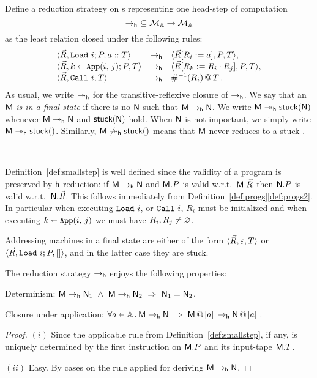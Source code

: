 \begin{defi}\label{def:smallstep}
Define a reduction strategy on \am s representing one head-step of computation
\[
	\redh\ \subseteq\cM\to\cM
\]
as the least relation closed under the following rules:
\[
	\begin{array}{lcl}
	\tuple{\vec R,\RaS i;P,\Cons a{T}} &\redh& \tuple{\vec R[R_i := a],P,T},\\
	\tuple{\vec R,\Apply i j k; P,T}&\redh&\tuple{\vec R[R_k := \App{R_i}{R_j}],P,T},\\
	\tuple{\vec R,\Call i,T}&\redh&\appT{\Lookinv {R_i}}{T}.\\
	\end{array}
\]
As usual, we write $\reddh$ for the transitive-reflexive closure of $\redh$.
We say that an \am{} $\mM$ \emph{is in a final state} if there is no $\mN$ such that $\mM\redh \mN$.
We write $\mM\reddh \stuck{\mN}$ whenever $\mM\reddh \mN$ and $\stuck{\mN}$ hold.
When $\mN$ is not important, we simply write $\mM\reddh\stuck{}$. Similarly, $\mM\not\reddh\stuck{}$ means that $\mM$ never reduces to a stuck \am.
\end{defi}

\begin{rem}\label{rem:aboutstuck}\
\bsub
\item Definition~\ref{def:smallstep} is well defined since the validity of a program is preserved by ${\sf h}$-reduction: if $\mM\redh\mN$ and $\mM.P$ is valid w.r.t.\ $\mM.\vec R$ then $\mN.P$ is valid w.r.t.\ $\mN.\vec R$. This follows immediately from Definition~\ref{def:progs}\ref{def:progs2}.
In particular when executing $\RaS i$, or $\Call i$, $R_i$ must be initialized and when executing $\Apply i j k$ we must have $R_i,R_j\neq\Null$.
\item\label{rem:aboutstuck2}
Addressing machines in a final state are either of the form $\tuple{\vec R,\varepsilon,T}$ or $\tuple{\vec R,\Load i;P,[]}$, and in the latter case they are stuck.
\esub
\end{rem}

\begin{lem}\label{lem:about_red}
The reduction strategy $\redh$ enjoys the following properties:
\bsub
\item\label{lem:about_red1}
	 Determinism: $\mM\redh \mN_1 \und \mM\redh \mN_2\ \Rightarrow\ \mN_1 = \mN_2$.
\item\label{lem:about_red2}
	Closure under application: $\forall a\in\Addrs\,.\,\mM\redh \mN\ \Rightarrow\ \append{\mM}{a}\redh \append{\mN}{a}$.
\esub
\end{lem}
\begin{proof} $(i)$ Since the applicable rule from Definition~\ref{def:smallstep}, if any, is uniquely determined by the first instruction on $\mM.P$ and its input-tape $\mM.T$.

$(ii)$ Easy. By cases on the rule applied for deriving $\mM\redh\mN$.
\end{proof}

